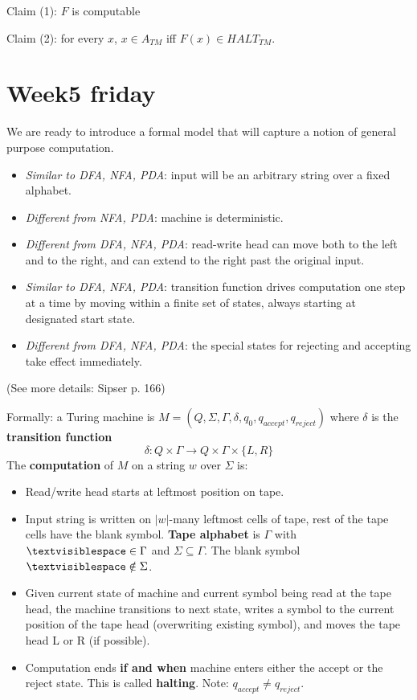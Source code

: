 \documentclass[12pt, oneside]{article}
\begin{document}
    
    Claim (1): $F$ is computable \phantom{\hspace{2in}}
    
    \vfill

    Claim (2): for every  $x$,  $x \in  A_{TM}$ iff $F(x) \in HALT_{TM}$.  
    
    \vfill
    \vfill
    \vfill \vfill
\section*{Week5 friday}


We are ready to introduce a formal model that will capture a notion of general purpose computation.
\begin{itemize}
\item {\it Similar to DFA, NFA, PDA}: input will be an arbitrary string over a fixed alphabet.
\item {\it Different from NFA, PDA}: machine is deterministic.
\item {\it Different from DFA, NFA, PDA}: read-write head can move both to the left and to the right,
and can extend to the right past the original input.
\item {\it Similar to DFA, NFA, PDA}: transition function drives computation one step at a time 
by moving within a finite set of states, always starting at designated start state.
\item {\it Different from DFA, NFA, PDA}: the special states for rejecting and accepting take effect immediately.
\end{itemize}

\vspace{-10pt}

(See more details: Sipser p. 166)

\vfill

Formally: a  Turing machine is $M= (Q, \Sigma, \Gamma, \delta, q_0, q_{accept}, q_{reject})$ 
where $\delta$ is the {\bf transition function} 
\[
  \delta: Q\times \Gamma \to Q \times \Gamma \times \{L, R\}
\]
The {\bf computation} of $M$ on a string $w$ over $\Sigma$  is:

\vspace{-10pt}

\begin{itemize}
\setlength{\itemsep}{0pt}
\item Read/write head starts at leftmost position on tape. 
\item Input string is written on $|w|$-many leftmost cells of tape, 
rest of  the tape cells have  the blank symbol. {\bf Tape alphabet} 
is $\Gamma$ with $\textvisiblespace\in \Gamma$ and $\Sigma \subseteq \Gamma$.
The blank symbol $\textvisiblespace \notin \Sigma$.
\item Given current state of machine and current symbol being read at the tape head, 
the machine transitions to next state, writes a symbol to the current position  of the 
tape  head (overwriting existing symbol), and moves the tape head L or R (if possible). 
\item Computation ends {\bf if and when} machine enters either the accept or the reject state.
This is called {\bf halting}.
Note: $q_{accept} \neq q_{reject}$.
\end{itemize}
\end{document}
